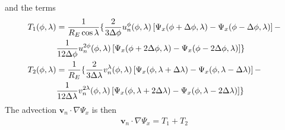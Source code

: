 %
and the terms
%
\begin{align}
  T_1(\phi,\lambda) & = \frac{1}{R_E \cos \lambda }
   \{ \frac{2}{3 \Delta \phi} u_n^{\phi}(\phi,\lambda)
     \left[\Psi_x(\phi+\Delta \phi,\lambda) -
    \Psi_x(\phi-\Delta \phi,\lambda)\right]- \notag \\
    {} & \frac{1}{12 \Delta \phi} u_n^{2\phi}(\phi,\lambda)
     \left[\Psi_x(\phi+2\Delta \phi,\lambda) -
    \Psi_x(\phi-2\Delta \phi,\lambda)\right] \} \\
%
  T_2(\phi,\lambda) &= \frac{1}{R_E } \{ \frac{2}{3 \Delta \lambda}
  v_n^{\lambda}(\phi,\lambda)
     \left[\Psi_x(\phi,\lambda+\Delta \lambda) -
    \Psi_x(\phi,\lambda-\Delta \lambda)\right]- \notag \\
    {} & \frac{1}{12 \Delta \lambda} v_n^{2\lambda}(\phi,\lambda)
     \left[\Psi_x(\phi,\lambda+2\Delta \lambda) -
    \Psi_x(\phi,\lambda-2\Delta \lambda)\right] \}
\end{align}
%
The advection $\mathbf{v}_n \cdot \nabla \Psi_x$ is then
%
\begin{align}
  \mathbf{v}_n \cdot \nabla \Psi_x = T_1 + T_2
\end{align}
%

